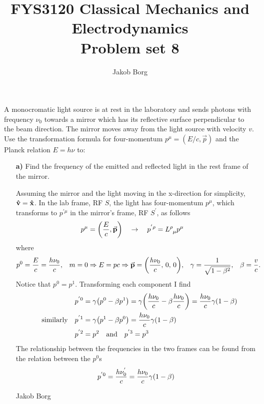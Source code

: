 \documentclass[11pt,a4paper]{report}
\title{FYS3120 Classical Mechanics and Electrodynamics\\ 
\vspace{15mm}Problem set 8}
\author{Jakob Borg}
\newcounter{excount}[chapter]
\newenvironment{exercise}[1][]{\addtocounter{excount}{1} \noindent {\bf Problem
    \arabic{excount} \ \ #1}\hspace{2mm}}{\vspace{4mm}}
\newenvironment{solution}[1][]
    {\begin{tcolorbox}[title=Solution #1,halign lower=right,breakable]
    }
    {
    \tcblower Jakob Borg
    \end{tcolorbox}
	\vspace{5mm}
    }
\begin{document}

\maketitle


\begin{exercise}
A monocromatic light source is at rest in the laboratory and sends photons with frequency $\nu_0$ towards a mirror which has its reflective surface perpendicular to the beam direction. The mirror moves away from the light source with velocity $v$. Use the transformation formula for four-momentum $p^\mu=(E/c,\vec p)$ and the Planck relation $E=h\nu$ to:
\begin{itemize}
\item[\bf a)] Find the frequency of the emitted and reflected light in the rest frame of the mirror.
\begin{solution}[\bf 1.a]
Assuming the mirror and the light moving in the x-direction for simplicity, $\vu{v} = \vu{x}$. In the lab frame, RF $S$, the light has four-momentum $p^\mu$, which transforms to $p^{'\mu}$ in the mirror's frame, RF $S^{'}$, as follows
\begin{align*}
p^\mu &= \qty(\frac{E}{c},\va{p}) \quad \rightarrow\quad p\indices{^'^\rho} = L\indices{^\rho_\mu}p^\mu
\end{align*}
where 
\begin{align*}
p^0 &= \frac{E}{c}= \frac{h\nu_0}{c}, & m = 0 \Rightarrow E = pc \Rightarrow  \va{p} &= \qty(\frac{h\nu_0}{c} ,\, 0,\, 0), & \gamma &= \frac{1}{\sqrt{1-\beta^2}}, & \beta &= \frac{v}{c}.
\end{align*}
Notice that $p^0 = p^1$. Transforming each component I find
\begin{align*}
p\indices{^'^0} &= \gamma\qty(p^0-\beta p^1) = \gamma \qty(\frac{h\nu_0}{c}-\beta\frac{h\nu_0}{c}) = \frac{h\nu_0}{c}\gamma (1-\beta)
\\
\qq{similarly} p\indices{^'^1} &= \gamma\qty(p^1-\beta p^0) = \frac{h\nu_0}{c}\gamma(1-\beta)
\\
p\indices{^'^2} &= p^2 \qand p\indices{^'^3} = p^3
\end{align*}
The relationship between the frequencies in the two frames can be found from the relation between the $p^0$s
\begin{align*}
p\indices{^'^0} &= \frac{h\nu^{'}_0}{c} = \frac{h\nu_0}{c}\gamma (1-\beta)
\\

\end{align*}
\end{solution}
\end{itemize}
\end{exercise}
\end{document}
